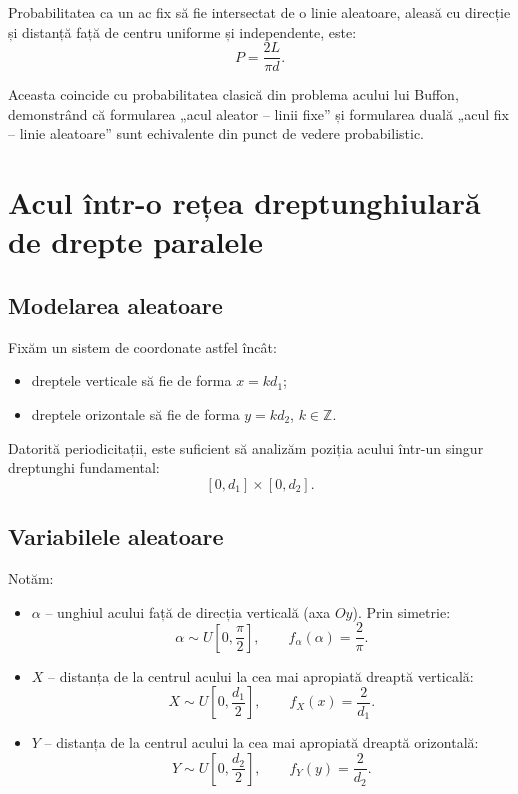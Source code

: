 \documentclass[12pt]{article}
\begin{document}
Probabilitatea ca un ac fix să fie intersectat de o linie aleatoare, aleasă cu direcție și distanță față de centru uniforme și independente, este:
\[
P = \frac{2L}{\pi d}.
\]

Aceasta coincide cu probabilitatea clasică din problema acului lui Buffon, demonstrând că formularea „acul aleator – linii fixe” și formularea duală „acul fix – linie aleatoare” sunt echivalente din punct de vedere probabilistic.

\newpage
{}\par
\section{Acul într-o rețea dreptunghiulară de drepte paralele}

\subsection{Modelarea aleatoare}

Fixăm un sistem de coordonate astfel încât:
\begin{itemize}
  \item dreptele verticale să fie de forma $x = k d_1$;
  \item dreptele orizontale să fie de forma $y = k d_2$, $k \in \mathbb{Z}$.
\end{itemize}

Datorită periodicitații, este suficient să analizăm poziția acului într-un singur dreptunghi fundamental:
\[
[0,d_1] \times [0,d_2].
\]

\subsection{Variabilele aleatoare}

Notăm:
\begin{itemize}
  \item $\alpha$ – unghiul acului față de direcția verticală (axa $Oy$). Prin simetrie:
  \[
  \alpha \sim U\!\left[0,\frac{\pi}{2}\right], \qquad
  f_\alpha(\alpha) = \frac{2}{\pi}.
  \]

  \item $X$ – distanța de la centrul acului la cea mai apropiată dreaptă verticală:
  \[
  X \sim U\!\left[0,\frac{d_1}{2}\right], \qquad
  f_X(x) = \frac{2}{d_1}.
  \]

  \item $Y$ – distanța de la centrul acului la cea mai apropiată dreaptă orizontală:
  \[
  Y \sim U\!\left[0,\frac{d_2}{2}\right], \qquad
  f_Y(y) = \frac{2}{d_2}.
  \]
\end{itemize}
\end{document}
